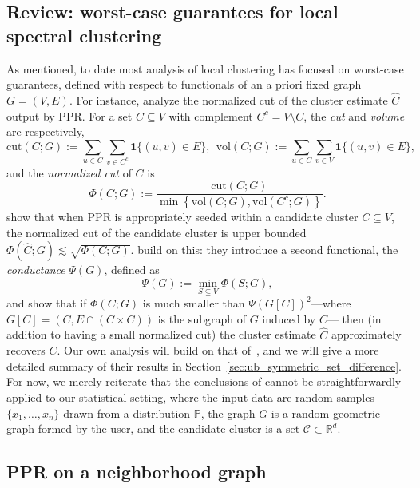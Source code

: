 \documentclass[11pt,twoside]{article}
\newcommand{\Reals}{\mathbb{R}}
\newcommand{\set}[1]{\left\{#1\right\}}
\newcommand{\1}{\mathbf{1}}
\newcommand{\Rd}{\Reals^d}
\newcommand{\mc}[1]{\mathcal{#1}}
\newcommand{\wh}[1]{\widehat{#1}}
\newcommand{\vol}{\mathrm{vol}}
\newcommand{\cut}{\mathrm{cut}}
\begin{document}
\subsection{Review: worst-case guarantees for local spectral clustering}
As mentioned, to date most analysis of local clustering has focused on worst-case guarantees, defined with respect to functionals of an a priori fixed graph $G = (V,E)$.  For instance, \cite{andersen2006} analyze the normalized cut of the cluster estimate $\wh{C}$ output by PPR. For a set $C \subseteq V$ with complement $C^c = V \!\setminus\! C$, the \emph{cut} and \emph{volume} are respectively,
\begin{equation}
\label{eqn:cut_volume}
\cut(C;G) := \sum_{u \in C} \sum_{v \in C^c}
\1\{(u,v) \in E\},~~ \vol(C; G) := \sum_{u \in C}  \sum_{v \in V} \1\{(u,v) \in E\},
\end{equation}
and the \emph{normalized cut} of $C$ is
\begin{equation}
\label{eqn:normalized_cut}
\Phi(C; G) := \frac{\cut(C;G)}{\min \set{\vol(C; G), \vol(C^c; G)}}.
\end{equation} 
\cite{andersen2006} show that when PPR is appropriately seeded within a candidate cluster $C \subseteq V$, the normalized cut of the candidate cluster is upper bounded $\Phi(\wh{C};G) \lesssim \sqrt{\Phi(C;G)}$. \cite{zhu2013} build on this: they introduce a second functional, the \emph{conductance} $\Psi(G)$, defined as 
\begin{equation}
\label{eqn:conductance}
\Psi(G) := \min_{S \subseteq V} \Phi(S;G),
\end{equation}
and show that if $\Phi(C;G)$ is much smaller than $\Psi(G[C])^2$---where $G[C] = (C,E \cap (C \times C))$ is the subgraph of $G$ induced by $C$--- then (in addition to having a small normalized cut) the cluster estimate $\wh{C}$ approximately recovers $C$. Our own analysis will build on that of~\cite{zhu2013}, and we will give a more detailed summary of their results in Section~\ref{sec:ub_symmetric_set_difference}.
For now, we merely reiterate that the conclusions of \citep{andersen2006,zhu2013} cannot be straightforwardly applied to our statistical setting, where the input data are random samples $\{x_1,\ldots,x_n\}$ drawn from a distribution $\mathbb{P}$, the graph $G$ is a random geometric graph formed by the user, and the candidate cluster is a set $\mc{C} \subset \Rd$. 

\subsection{PPR on a neighborhood graph}
\end{document}
